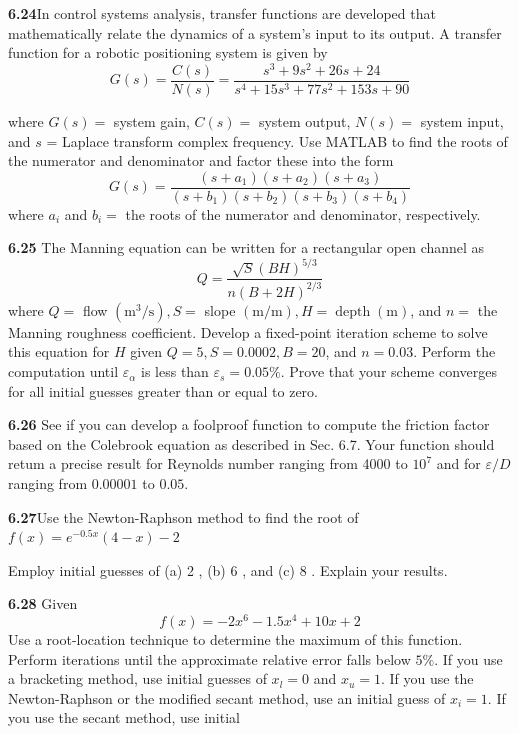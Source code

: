 \documentclass[../main.tex]{subfiles}
\begin{document}
\begin{multicols}{2}
    \noindent\textbf{6.24}In control systems analysis, transfer functions are developed that mathematically relate the dynamics of a system's input to its output. A transfer function for a robotic positioning system is given by
    $$
    G(s)=\frac{C(s)}{N(s)}=\frac{s^{3}+9 s^{2}+26 s+24}{s^{4}+15 s^{3}+77 s^{2}+153 s+90}
    $$

    where $G(s)=$ system gain, $C(s)=$ system output, $N(s)=$ system input, and $s$ = Laplace transform complex frequency. Use MATLAB to find the roots of the numerator and denominator and factor these into the form
    $$
    G(s)=\frac{\left(s+a_{1}\right)\left(s+a_{2}\right)\left(s+a_{3}\right)}{\left(s+b_{1}\right)\left(s+b_{2}\right)\left(s+b_{3}\right)\left(s+b_{4}\right)}
    $$
    where $a_{i}$ and $b_{i}=$ the roots of the numerator and denominator, respectively.
    
    \noindent\textbf{6.25} The Manning equation can be written for a rectangular open channel as
    $$
    Q=\frac{\sqrt{S}(B H)^{5 / 3}}{n(B+2 H)^{2 / 3}}
    $$
    where $Q=$ flow $\left(\mathrm{m}^{3} / \mathrm{s}\right), S=$ slope $(\mathrm{m} / \mathrm{m}), H=\operatorname{depth}(\mathrm{m})$, and $n=$ the Manning roughness coefficient. Develop a fixed-point iteration scheme to solve this equation for $H$ given $Q=5, S=0.0002, B=20$, and $n=0.03$. Perform the computation until $\varepsilon_{\alpha}$ is less than $\varepsilon_{s}=0.05 \%$. Prove that your scheme converges for all initial guesses greater than or equal to zero.
    
    \noindent\textbf{6.26} See if you can develop a foolproof function to compute the friction factor based on the Colebrook equation as described in Sec. 6.7. Your function should retum a precise result for Reynolds number ranging from 4000 to $10^{7}$ and for $\varepsilon / D$ ranging from $0.00001$ to $0.05$.
    
    \noindent\textbf{6.27}Use the Newton-Raphson method to find the root of $f(x)=e^{-0.5 x}(4-x)-2$

    Employ initial guesses of (a) 2 , (b) 6 , and (c) 8 . Explain your results.
    
    \noindent\textbf{6.28} Given
    $$
    f(x)=-2 x^{6}-1.5 x^{4}+10 x+2
    $$
    Use a root-location technique to determine the maximum of this function. Perform iterations until the approximate relative error falls below $5 \%$. If you use a bracketing method, use initial guesses of $x_{l}=0$ and $x_{u}=1$. If you use the Newton-Raphson or the modified secant method, use an initial guess of $x_{i}=1$. If you use the secant method, use initial


\end{multicols}
\end{document}
